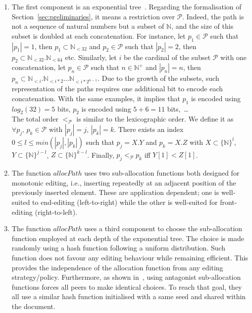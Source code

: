 \begin{enumerate}[leftmargin=*]
\item The first component is an exponential
  tree~\cite{andersson1996faster,andersson2007dynamic}. Regarding the
  formalisation of Section~\ref{sec:preliminaries}, it means a restriction over
  $\mathcal{P}$. Indeed, the path is not a sequence of natural numbers but a
  subset of $\mathbb{N}$, and the size of this subset is doubled at each
  concatenation. For instance, let $p_1\in\mathcal{P}$ such that $|p_1|=1$,
  then $p_1\subset \mathbb{N}_{<32}$ and $p_2\in\mathcal{P}$ such that
  $|p_2|=2$, then $p_2\subset \mathbb{N}_{<32}.\mathbb{N}_{<64}$
  etc. Similarly, let $i$ be the cardinal of the subset $\mathcal{P}$ with one
  concatenation, let $p_n\in\mathcal{P}$ such that $n\in\mathbb{N}^+$ and
  $|p_n|=n$, then
  $p_n\subset
  \mathbb{N}_{<i}.\mathbb{N}_{<i*2}\ldots\mathbb{N}_{<i*2^{n-1}}$.
  Due to the growth of the subsets, such representation of the paths requires
  one additional bit to encode each concatenation. With the same examples, it
  implies that $p_1$ is encoded using $log_2(32)=5$ bits, $p_2$ is encoded
  using $5+6=11$ bits,~\ldots \\ The total order $<_{\mathcal{P}}$ is similar
  to the lexicographic order. We define it as $\forall p_j,\,p_k\in\mathcal{P}$
  with $|p_j|=j$, $|p_k|=k$. There exists an index
  $0\leq l\leq min(|p_j|,|p_k|)$ such that $p_j = X.Y$ and $p_k = X.Z$ with
  $X\subset \{\mathbb{N}\}^l$, $Y \subset \{\mathbb{N}\}^{j-l}$,
  $Z \subset \{\mathbb{N}\}^{k-l}$. Finally, $p_j<_{\mathcal{P}}p_k$ iff
  $Y[1]<Z[1]$.
\item The function $allocPath$ uses two sub-allocation functions both designed
  for monotonic editing, i.e., inserting repeatedly at an adjacent position of
  the previously inserted element. These are application dependent; one is
  well-suited to end-editing (left-to-right) while the other is well-suited for
  front-editing (right-to-left).
\item The function $allocPath$ uses a third component to choose the
  sub-allocation function employed at each depth of the exponential tree. The
  choice is made randomly using a hash function following a uniform
  distribution. Such function does not favour any editing behaviour while
  remaining efficient. This provides the independence of the allocation
  function from any editing strategy/policy. Furthermore, as shown
  in~\cite{nedelec2013concurrency}, using antagonist sub-allocation functions
  forces all peers to make identical choices. To reach that goal, they all use
  a similar hash function initialised with a same seed and shared within the
  document.
\end{enumerate}

